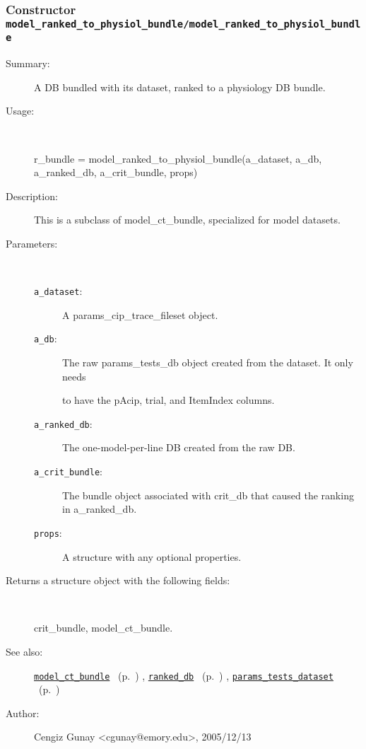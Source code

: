 \subsubsection[Constructor \texttt{model\_ranked\_to\_physiol\_bundle}]{Constructor \texttt{model\_ranked\_to\_physiol\_bundle/model\_ranked\_to\_physiol\_bundle}}%
%
\label{ref_model_ranked_to_physiol_bundle__model_ranked_to_physiol_bundle}%
\hypertarget{ref_model_ranked_to_physiol_bundle__model_ranked_to_physiol_bundle}{}%
\begin{description}
\item[Summary:]A DB bundled with its dataset, ranked to a physiology DB bundle.
%
\item[Usage:]~%
\begin{lyxcode}%
r\_bundle = model\_ranked\_to\_physiol\_bundle(a\_dataset, a\_db, a\_ranked\_db, a\_crit\_bundle, props)
%
\end{lyxcode}%
%
\item[Description:]%
This is a subclass of model\_ct\_bundle, specialized for model datasets. 
\item[Parameters:]~
\begin{description}%
\item[\texttt{a\_dataset}:]
 A params\_cip\_trace\_fileset object.
\item[\texttt{a\_db}:]
 The raw params\_tests\_db object created from the dataset. It only needs

to have the pAcip, trial, and ItemIndex columns.
\item[\texttt{a\_ranked\_db}:]
 The one-model-per-line DB created from the raw DB.
\item[\texttt{a\_crit\_bundle}:]
 The bundle object associated with crit\_db that caused the ranking in a\_ranked\_db.
\item[\texttt{props}:]
 A structure with any optional properties.
\end{description}%
%
\item[Returns a structure object with the following fields:
]~

	crit\_bundle, model\_ct\_bundle.
%
%
\item[See also:]%
\hyperlink{ref_model_ct_bundle}{\texttt{model\_ct\_bundle}}%
\ (p.~\pageref{ref_model_ct_bundle})%
%
, \hyperlink{ref_ranked_db}{\texttt{ranked\_db}}%
\ (p.~\pageref{ref_ranked_db})%
%
, \hyperlink{ref_params_tests_dataset}{\texttt{params\_tests\_dataset}}%
\ (p.~\pageref{ref_params_tests_dataset})%
%
%
\item[Author:]%
Cengiz Gunay <cgunay@emory.edu>, 2005/12/13
%
\end{description}
\methodline%
